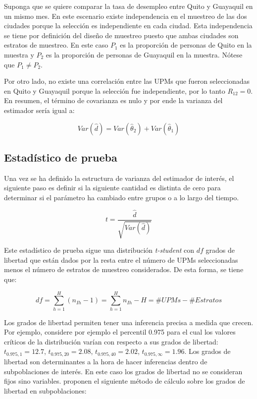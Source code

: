 Suponga que se quiere comparar la tasa de desempleo entre Quito y Guayaquil en un mismo mes. En este escenario existe independencia en el muestreo de las dos ciudades porque la selección es independiente en cada ciudad. Esta independencia se tiene por definición del diseño de muestreo puesto que ambas ciudades son estratos de muestreo. En este caso \(P_1\) es la proporción de personas de Quito en la muestra y \(P_2\) es la proporción de personas de Guayaquil en la muestra. Nótese que \(P_1 \neq P_2\).

Por otro lado, no existe una correlación entre las UPMs que fueron seleccionadas en Quito y Guayaquil porque la selección fue independiente, por lo tanto \(R_{12} = 0\). En resumen, el término de covarianza es nulo y por ende la varianza del estimador sería igual a:

\[
Var(\hat{d}) 
= Var(\hat{\theta}_2) + Var(\hat{\theta}_1)
\]

\hypertarget{estadistico-de-prueba}{%
\subsection{Estadístico de prueba}\label{estadistico-de-prueba}}

Una vez se ha definido la estructura de varianza del estimador de interés, el siguiente paso es definir si la siguiente cantidad es distinta de cero para determinar si el parámetro ha cambiado entre grupos o a lo largo del tiempo.

\[
t = \frac{\hat{d}}{\sqrt{Var(\hat{d})}}
\]

Este estadístico de prueba sigue una distribución \emph{t-student} con \(df\) grados de libertad que están dados por la resta entre el número de UPMs seleccionadas menos el número de estratos de muestreo considerados. De esta forma, se tiene que:

\[
df = \sum_{h=1}^H (n_{Ih} - 1) = \sum_{h=1}^H n_{Ih} - H = \#UPMs - \#Estratos
\]

Los grados de libertad permiten tener una inferencia precisa a medida que crecen. Por ejemplo, considere por ejemplo el percentil 0.975 para el cual los valores críticos de la distribución varían con respecto a sus grados de libertad: \(t_{0.975, 1}=12.7\), \(t_{0.975, 20}=2.08\), \(t_{0.975, 40}=2.02\), \(t_{0.975, \infty}=1.96\). Los grados de libertad son determinantes a la hora de hacer inferencias dentro de subpoblaciones de interés. En este caso los grados de libertad no se consideran fijos sino variables. \citet{Korn_Graubard_1999} proponen el siguiente método de cálculo sobre los grados de libertad en subpoblaciones:

